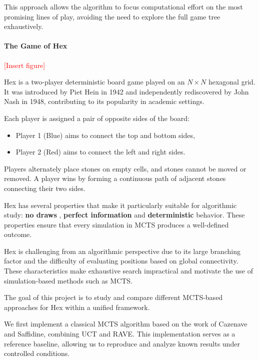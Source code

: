 \documentclass[11pt,a4paper]{article}
\begin{document}
This approach allows the algorithm to focus computational effort on the most promising lines of play, avoiding the need to explore the full game tree exhaustively.

\paragraph{The Game of Hex}

\textcolor{red}{[Insert figure]}

Hex is a two-player deterministic board game played on an $N \times N$ hexagonal grid. It was introduced by Piet Hein in 1942 and independently rediscovered by John Nash in 1948, contributing to its popularity in academic settings.

Each player is assigned a pair of opposite sides of the board:
\begin{itemize}
    \item Player 1 (Blue) aims to connect the top and bottom sides,
    \item Player 2 (Red) aims to connect the left and right sides.
\end{itemize}

Players alternately place stones on empty cells, and stones cannot be moved or removed. A player wins by forming a continuous path of adjacent stones connecting their two sides.

\medskip 

Hex has several properties that make it particularly suitable for algorithmic study: \textbf{no draws} \cite{jing2011hex,yang2025briefreviewfixedpoints}, \textbf{perfect information} and \textbf{deterministic} behavior. These properties ensure that every simulation in MCTS produces a well-defined outcome.

\medskip

Hex is challenging from an algorithmic perspective due to its large branching factor and the difficulty of evaluating positions based on global connectivity. These characteristics make exhaustive search impractical and motivate the use of simulation-based methods such as MCTS.

\medskip 

The goal of this project is to study and compare different MCTS-based approaches for Hex within a unified framework.

We first implement a classical MCTS algorithm based on the work of Cazenave and Saffidine, combining UCT and RAVE. This implementation serves as a reference baseline, allowing us to reproduce and analyze known results under controlled conditions.
\end{document}
